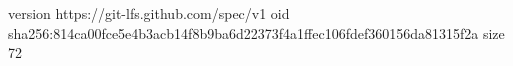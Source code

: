 version https://git-lfs.github.com/spec/v1
oid sha256:814ca00fce5e4b3acb14f8b9ba6d22373f4a1ffec106fdef360156da81315f2a
size 72
